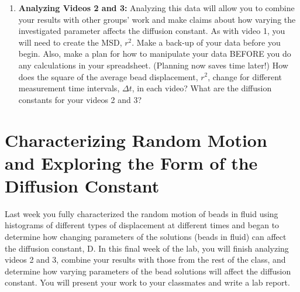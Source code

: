 \begin{enumerate}
\item \textbf{Analyzing Videos 2 and 3:} Analyzing this data will allow you to combine your results with other groups' work and make claims about how varying the investigated parameter affects the diffusion constant. As with video 1, you will need to create the MSD, $r^{2}$. Make a back-up of your data before you begin. Also, make a plan for how to manipulate your data BEFORE you do any calculations in your spreadsheet. (Planning now saves time later!) How does the square of the average bead displacement, $r^{2}$, change for different measurement time intervals, $\Delta t$, in each video? What are the diffusion constants for your videos 2 and 3?
\end{enumerate}

\section{Characterizing Random Motion and Exploring the Form of the Diffusion Constant}
Last week you fully characterized the random motion of beads in fluid using histograms of different types of displacement at different times and began to determine how changing parameters of the solutions (beads in fluid) can affect the diffusion constant, D. In this final week of the lab, you will finish analyzing videos 2 and 3, combine your results with those from the rest of the class, and determine how varying parameters of the bead solutions will affect the diffusion constant. You will present your work to your classmates and write a lab report.

